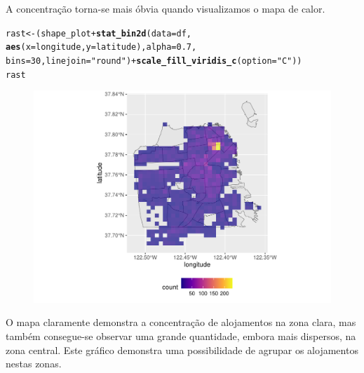 \documentclass[justified, 11pt]{scrartcl}\usepackage[]{graphicx}\usepackage[]{xcolor}
\makeatletter
\def\maxwidth{ %
  \ifdim\Gin@nat@width>\linewidth
    \linewidth
  \else
    \Gin@nat@width
  \fi
}
\newcommand{\hlnum}[1]{\textcolor[rgb]{0.686,0.059,0.569}{#1}}%
\newcommand{\hlstr}[1]{\textcolor[rgb]{0.192,0.494,0.8}{#1}}%
\newcommand{\hlopt}[1]{\textcolor[rgb]{0,0,0}{#1}}%
\newcommand{\hlstd}[1]{\textcolor[rgb]{0.345,0.345,0.345}{#1}}%
\newcommand{\hlkwb}[1]{\textcolor[rgb]{0.69,0.353,0.396}{#1}}%
\newcommand{\hlkwc}[1]{\textcolor[rgb]{0.333,0.667,0.333}{#1}}%
\newcommand{\hlkwd}[1]{\textcolor[rgb]{0.737,0.353,0.396}{\textbf{#1}}}%
\newenvironment{kframe}{%
 \def\at@end@of@kframe{}%
 \ifinner\ifhmode%
  \def\at@end@of@kframe{\end{minipage}}%
  \begin{minipage}{\columnwidth}%
 \fi\fi%
 \def\FrameCommand##1{\hskip\@totalleftmargin \hskip-\fboxsep
 \colorbox{shadecolor}{##1}\hskip-\fboxsep
     \hskip-\linewidth \hskip-\@totalleftmargin \hskip\columnwidth}%
 \MakeFramed {\advance\hsize-\width
   \@totalleftmargin\z@ \linewidth\hsize
   \@setminipage}}%
 {\par\unskip\endMakeFramed%
 \at@end@of@kframe}
\newenvironment{knitrout}{}{} %
\makeatother
\begin{document}
A concentração torna-se mais óbvia quando visualizamos o mapa de calor.
\begin{knitrout}
\color{fgcolor}\begin{kframe}
\begin{alltt}
\hlstd{rast} \hlkwb{<-} \hlstd{(shape_plot} \hlopt{+} \hlkwd{stat_bin2d}\hlstd{(}\hlkwc{data} \hlstd{= df,}
    \hlkwd{aes}\hlstd{(}\hlkwc{x} \hlstd{= longitude,} \hlkwc{y} \hlstd{= latitude),} \hlkwc{alpha} \hlstd{=} \hlnum{0.7}\hlstd{,}
    \hlkwc{bins} \hlstd{=} \hlnum{30}\hlstd{,} \hlkwc{linejoin} \hlstd{=} \hlstr{"round"}\hlstd{)} \hlopt{+} \hlkwd{scale_fill_viridis_c}\hlstd{(}\hlkwc{option} \hlstd{=} \hlstr{"C"}\hlstd{))}
\hlstd{rast}
\end{alltt}
\end{kframe}\begin{figure}
\includegraphics[width=\maxwidth]{figure/chunk-rasterPlaces-1} \end{figure}

\end{knitrout}
O mapa claramente demonstra a concentração de alojamentos na zona clara, mas também consegue-se observar uma grande quantidade, embora mais dispersos, na zona central. Este gráfico demonstra uma possibilidade de agrupar os alojamentos nestas zonas.
\end{document}

